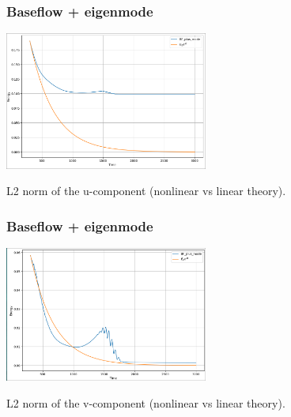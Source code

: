 \documentclass[
  aspectratio=169, %
  t, %
  onlytextwidth, %
  10pt, %
]{beamer}
\begin{document}
\begin{frame}
  \frametitle{Baseflow + eigenmode}
  {
    \centering
    \includegraphics[width=0.5\textwidth]{Images/bf_u.png}

    L2 norm of the u-component (nonlinear vs linear theory).
  }

\end{frame}
\begin{frame}
  \frametitle{Baseflow + eigenmode}
  {
    \centering
    \includegraphics[width=0.5\textwidth]{Images/bf_v.png}

    L2 norm of the v-component (nonlinear vs linear theory).
  }

\end{frame}
\end{document}
